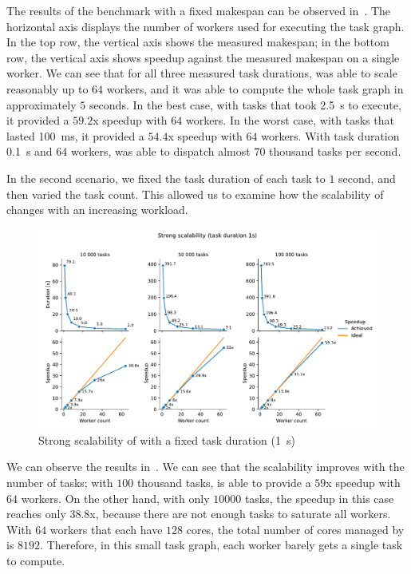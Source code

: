 The results of the benchmark with a fixed makespan can be observed in~. The
horizontal axis displays the number of workers used for executing the task graph. In the top row,
the vertical axis shows the measured makespan; in the bottom row, the vertical axis shows speedup
against the measured makespan on a single worker. We can see that for all three measured task
durations, \hyperqueue{} was able to scale reasonably up to $64$
workers, and it was able to compute the whole task graph in approximately $5$
seconds. In the best case, with tasks that took \SI{2.5}{\second} to execute, it provided a
$59.2$x speedup with $64$ workers. In the worst case, with tasks
that lasted \SI{100}{\milli\second}, it provided a $54.4$x speedup with
$64$ workers. With task duration \SI{0.1}{\second} and
$64$ workers, \hyperqueue{} was able to dispatch almost
$70$ thousand tasks per second.

In the second scenario, we fixed the task duration of each task to $1$ second,
and then varied the task count. This allowed us to examine how the scalability of
\hyperqueue{} changes with an increasing workload.

\begin{figure}[h]
	\centering
	\includegraphics[width=\textwidth]{imgs/hq/charts/scalability-fixed-task-duration}
	\caption{Strong scalability of \hyperqueue{} with a fixed task duration (\SI{1}{\second})}
	\label{fig:hq-scalability-fixed-task-duration}
\end{figure}

We can observe the results in~. We can see that the scalability improves
with the number of tasks; with $100$ thousand tasks, \hyperqueue{} is
able to provide a $59$x speedup with $64$ workers. On the other
hand, with only $10000$ tasks, the speedup in this case reaches only
$38.8$x, because there are not enough tasks to saturate all workers. With
$64$ workers that each have $128$ cores, the total number of
cores managed by \hq{} is $8192$. Therefore, in this small task
graph, each worker barely gets a single task to compute.

